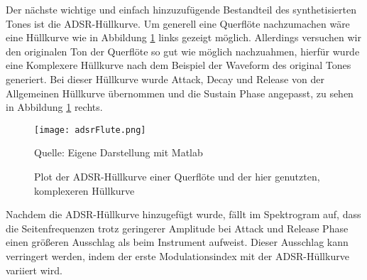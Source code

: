 Der nächste wichtige und einfach hinzuzufügende Bestandteil des synthetisierten Tones ist die ADSR-Hüllkurve. Um generell eine Querflöte nachzumachen wäre eine Hüllkurve wie in Abbildung \ref{fig:adsrFlute} links gezeigt möglich. Allerdings versuchen wir den originalen Ton der Querflöte so gut wie möglich nachzuahmen, hierfür wurde eine Komplexere Hüllkurve nach dem Beispiel der Waveform des original Tones generiert. Bei dieser Hüllkurve wurde Attack, Decay und Release von der Allgemeinen Hüllkurve übernommen und die Sustain Phase angepasst, zu sehen in Abbildung \ref{fig:adsrFlute} rechts. 

\begin{figure} [ht]
\centering
  \texttt{[image: adsrFlute.png]}
\caption{Plot der ADSR-Hüllkurve einer Querflöte und der hier genutzten, komplexeren Hüllkurve}
\label{fig:adsrFlute}
Quelle: Eigene Darstellung mit Matlab
\end{figure}

Nachdem die ADSR-Hüllkurve hinzugefügt wurde, fällt im Spektrogram auf, dass die Seitenfrequenzen trotz geringerer Amplitude bei Attack und Release Phase einen größeren Ausschlag als beim Instrument aufweist. Dieser Ausschlag kann verringert werden, indem der erste Modulationsindex mit der ADSR-Hüllkurve variiert wird. 

